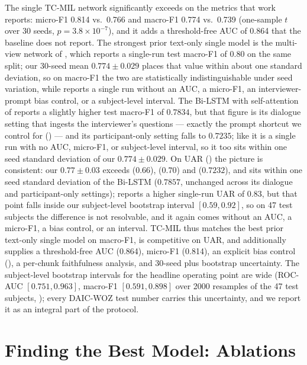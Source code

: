 \documentclass[conference]{IEEEtran}
\begin{document}
The single TC-MIL network significantly exceeds \cite{milintsevich2023} on the
metrics that work reports: micro-F1 0.814 vs.\ 0.766 and macro-F1 0.774 vs.\
0.739 (one-sample $t$ over 30 seeds, $p=3.8\!\times\!10^{-7}$), and it adds a
threshold-free AUC of 0.864 that the baseline does not report. The strongest
prior text-only single model is the multi-view network of \cite{agarwal2024},
which reports a single-run test macro-F1 of 0.80 on the same split; our 30-seed
mean $0.774\pm0.029$ places that value within about one standard deviation, so on
macro-F1 the two are statistically indistinguishable under seed variation, while
\cite{agarwal2024} reports a single run without an AUC, a micro-F1, an
interviewer-prompt bias control, or a subject-level interval. The Bi-LSTM with
self-attention of \cite{10006532} reports a slightly higher test macro-F1 of
$0.7834$, but that figure is its dialogue setting that ingests the interviewer's
questions --- exactly the prompt shortcut we control for (\Cref{sec:interpret})
--- and its participant-only setting falls to $0.7235$; like \cite{agarwal2024} it
is a single run with no AUC, micro-F1, or subject-level interval, so it too sits
within one seed standard deviation of our $0.774\pm0.029$. On UAR
(\Cref{tab:external}) the picture is consistent: our $0.77\pm0.03$ exceeds
\cite{mallolragolta2019} ($0.66$), \cite{xezonaki20_interspeech} ($0.70$) and
\cite{agarwal2022mv} ($0.7232$), and sits within one seed standard deviation of
the Bi-LSTM ($0.7857$, unchanged across its dialogue and participant-only
settings); \cite{agarwal2024} reports a higher single-run UAR of $0.83$, but
that point falls inside our subject-level bootstrap interval $[0.59, 0.92]$, so
on 47 test subjects the difference is not resolvable, and it again comes without
an AUC, a micro-F1, a bias control, or an interval. TC-MIL thus matches
the best prior text-only single model on macro-F1, is competitive on UAR, and
additionally supplies a threshold-free AUC (0.864), micro-F1 (0.814), an
explicit bias control (\Cref{sec:interpret}), a per-chunk faithfulness analysis,
and 30-seed plus bootstrap uncertainty. The subject-level bootstrap intervals for the
headline operating point are wide (ROC-AUC $[0.751, 0.963]$, macro-F1
$[0.591, 0.898]$ over 2000 resamples of the 47 test subjects, );
every DAIC-WOZ test number carries this uncertainty, and we report it as an
integral part of the protocol.

\section{Finding the Best Model: Ablations}
\label{sec:ablation}
\end{document}
